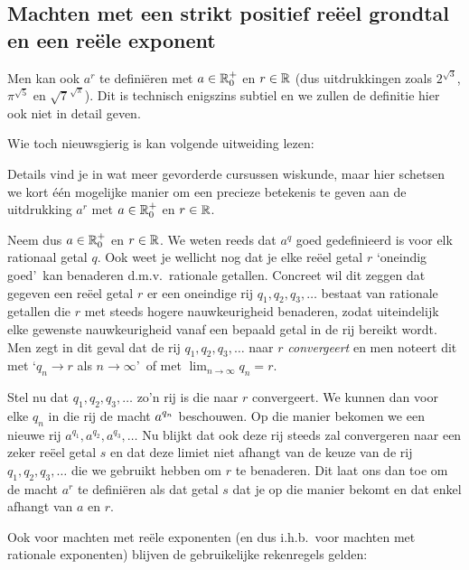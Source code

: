 \documentclass{ximera}
\begin{document}
\subsection*{Machten met een strikt positief re\"eel grondtal en een re\"ele exponent}\label{machten-r}
Men kan ook $a^r$ te definiëren met $a\in\mathbb{R}_0^+$
en $r\in\mathbb{R}$ (dus uitdrukkingen zoals $2^{\sqrt{3}}$, $\pi^{\sqrt{5}}$ en $\sqrt{7}^{\sqrt{\pi}}$). Dit is technisch enigszins subtiel en we zullen de definitie hier
ook niet in detail geven. 

Wie toch nieuwsgierig is kan volgende uitweiding lezen:

\begin{uitwijding}

Details vind je in wat meer gevorderde cursussen wiskunde, maar hier schetsen we kort \'{e}\'{e}n mogelijke manier om een precieze betekenis te geven
aan de uitdrukking $a^r$ met $a\in\mathbb{R}_0^+$ en $r\in\mathbb{R}$.

Neem dus $a\in\mathbb{R}_0^+$ en $r\in\mathbb{R}$. We weten reeds dat $a^q$
goed gedefinieerd is voor elk rationaal getal $q$. Ook weet je
wellicht nog dat je elke re\"eel getal $r$ \lq oneindig goed\rq\
kan benaderen d.m.v.~rationale getallen. Concreet wil dit zeggen
dat gegeven een re\"eel getal $r$ er een oneindige rij
$q_1,q_2,q_3,\ldots$ bestaat van rationale getallen die $r$ met
steeds hogere nauwkeurigheid benaderen, zodat uiteindelijk elke
gewenste nauwkeurigheid vanaf een bepaald getal in de rij bereikt
wordt. Men zegt in dit geval dat de rij $q_1,q_2,q_3,\ldots$ naar
$r$ \emph{convergeert} en men noteert dit met \lq $q_n\to r$ als
$n\to\infty$\rq\ of met $\lim_{n\to\infty}q_n=r$.

Stel nu dat $q_1,q_2,q_3,\ldots$ zo'n rij is die naar $r$
convergeert. We kunnen dan voor elke $q_n$ in die rij de macht
$\displaystyle a^{q_n}$ beschouwen. Op die manier bekomen we een nieuwe rij
$a^{q_1},a^{q_2},a^{q_3},\ldots$ Nu blijkt dat ook deze rij steeds
zal convergeren naar een zeker re\"eel getal $s$ en dat deze
limiet niet afhangt van de keuze van de rij $q_1,q_2,q_3,\ldots$
die we gebruikt hebben  om $r$ te benaderen. Dit laat ons dan toe
om de macht $a^r$ te defini\"eren als dat getal $s$ dat je op die
manier bekomt en dat enkel afhangt van $a$ en $r$.

\end{uitwijding}

Ook voor machten met re\"ele exponenten (en dus i.h.b.~voor
machten met rationale exponenten) blijven de gebruikelijke
rekenregels  gelden:
\end{document}
